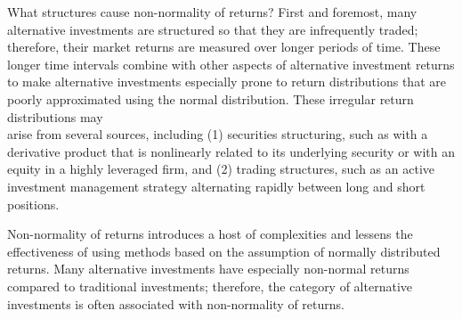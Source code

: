 \documentclass[11pt]{article}
\begin{document}
What structures cause non-normality of returns? First and foremost, many alternative investments are structured so that they are infrequently traded; therefore, their market returns are measured over longer periods of time. These longer time intervals combine with other aspects of alternative investment returns to make alternative investments especially prone to return distributions that are poorly approximated using the normal distribution. These irregular return distributions may\\
arise from several sources, including (1) securities structuring, such as with a derivative product that is nonlinearly related to its underlying security or with an equity in a highly leveraged firm, and (2) trading structures, such as an active investment management strategy alternating rapidly between long and short positions.

Non-normality of returns introduces a host of complexities and lessens the effectiveness of using methods based on the assumption of normally distributed returns. Many alternative investments have especially non-normal returns compared to traditional investments; therefore, the category of alternative investments is often associated with non-normality of returns.
\end{document}
